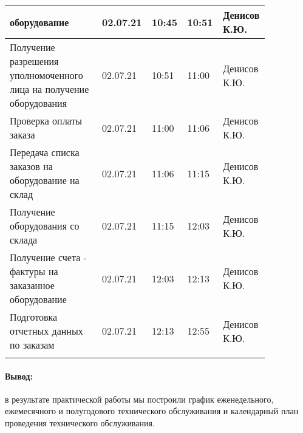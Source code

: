 \documentclass[a4paper,14pt]{extarticle}
\begin{document}
\begin{longtable}{|p{0.35\linewidth}|p{0.1\linewidth}|p{0.1\linewidth}|p{0.13\linewidth}|p{0.17\linewidth}|}
		оборудование  & 02.07.21 & 10:45 & 10:51 & Денисов К.Ю. \\ \hline
		Получение разрешения уполномоченного 
		лица на получение оборудования  & 02.07.21 & 10:51 & 11:00 & Денисов К.Ю. \\ \hline
		Проверка оплаты заказа  & 02.07.21 & 11:00 & 11:06 & Денисов К.Ю. \\ \hline
		Передача списка заказов на 
		оборудование на склад  & 02.07.21 & 11:06 & 11:15 & Денисов К.Ю. \\ \hline
		Получение оборудования со склада  & 02.07.21 & 11:15 & 12:03 & Денисов К.Ю. \\ \hline
		Получение счета - фактуры на 
		заказанное оборудование  & 02.07.21 & 12:03 & 12:13 & Денисов К.Ю. \\ \hline
		Подготовка отчетных данных по 
		заказам  & 02.07.21 & 12:13 & 12:55 & Денисов К.Ю. \\ \hline
		\label{tab:calendar-year}
	\end{longtable}

\paragraph{Вывод:}
в результате практической работы мы построили график еженедельного, ежемесячного и полугодового технического обслуживания и календарный план проведения технического обслуживания.





\normalsize
\end{document}
